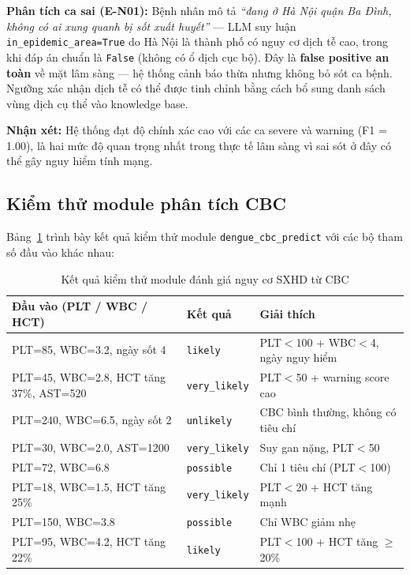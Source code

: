 \documentclass[a4paper,13pt,3p,twoside,openany]{report}
\theoremstyle{definition}
\theoremstyle{remark}
\theoremstyle{definition}
\let\ORIGsubsection\subsection
\renewcommand{\subsection}{\needspace{3\baselineskip}\ORIGsubsection}
\begin{document}
\textbf{Phân tích ca sai (E-N01):} Bệnh nhân mô tả \textit{``đang ở Hà Nội quận Ba Đình, không có ai xung quanh bị sốt xuất huyết''} — LLM suy luận \texttt{in\_epidemic\_area=True} do Hà Nội là thành phố có nguy cơ dịch tễ cao, trong khi đáp án chuẩn là \texttt{False} (không có ổ dịch cục bộ). Đây là \textbf{false positive an toàn} về mặt lâm sàng — hệ thống cảnh báo thừa nhưng không bỏ sót ca bệnh. Ngưỡng xác nhận dịch tễ có thể được tinh chỉnh bằng cách bổ sung danh sách vùng dịch cụ thể vào knowledge base.

\textbf{Nhận xét:} Hệ thống đạt độ chính xác cao với các ca severe và warning (F1 = 1.00), là hai mức độ quan trọng nhất trong thực tế lâm sàng vì sai sót ở đây có thể gây nguy hiểm tính mạng.

\subsection{Kiểm thử module phân tích CBC}

Bảng~\ref{tab:cbc-test} trình bày kết quả kiểm thử module \texttt{dengue\_cbc\_predict} với các bộ tham số đầu vào khác nhau:

\begin{table}[H]
\centering
\begin{tabular}{|p{4.5cm}|p{2.5cm}|p{5.2cm}|}
\hline
\textbf{Đầu vào (PLT / WBC / HCT)} & \textbf{Kết quả} & \textbf{Giải thích} \\
\hline
PLT=85, WBC=3.2, ngày sốt 4 & \texttt{likely} & PLT$<$100 + WBC$<$4, ngày nguy hiểm \\
\hline
PLT=45, WBC=2.8, HCT tăng 37\%, AST=520 & \texttt{very\_likely} & PLT$<$50 + warning score cao \\
\hline
PLT=240, WBC=6.5, ngày sốt 2 & \texttt{unlikely} & CBC bình thường, không có tiêu chí \\
\hline
PLT=30, WBC=2.0, AST=1200 & \texttt{very\_likely} & Suy gan nặng, PLT$<$50 \\
\hline
PLT=72, WBC=6.8 & \texttt{possible} & Chỉ 1 tiêu chí (PLT$<$100) \\
\hline
PLT=18, WBC=1.5, HCT tăng 25\% & \texttt{very\_likely} & PLT$<$20 + HCT tăng mạnh \\
\hline
PLT=150, WBC=3.8 & \texttt{possible} & Chỉ WBC giảm nhẹ \\
\hline
PLT=95, WBC=4.2, HCT tăng 22\% & \texttt{likely} & PLT$<$100 + HCT tăng $\geq$20\% \\
\hline
\end{tabular}
\caption{Kết quả kiểm thử module đánh giá nguy cơ SXHD từ CBC}
\label{tab:cbc-test}
\end{table}
\end{document}
